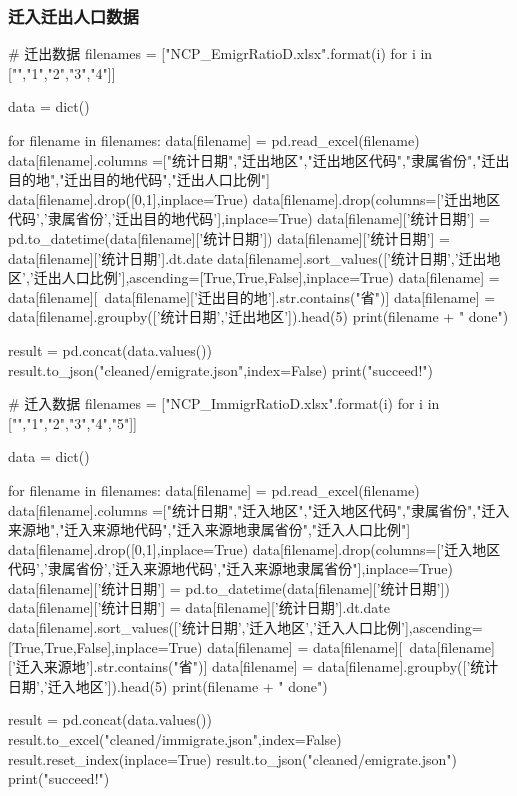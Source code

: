 \documentclass{ctexart}
\begin{document}
\subsubsection{迁入迁出人口数据}
\begin{python}
# 迁出数据
filenames = ["NCP_EmigrRatioD{}.xlsx".format(i) for i in ["","1","2","3","4"]]

data = dict()

for filename in filenames:
    data[filename] = pd.read_excel(filename)
    data[filename].columns =["统计日期","迁出地区","迁出地区代码","隶属省份","迁出目的地","迁出目的地代码","迁出人口比例"]
    data[filename].drop([0,1],inplace=True)
    data[filename].drop(columns=['迁出地区代码','隶属省份','迁出目的地代码'],inplace=True)
    data[filename]['统计日期'] = pd.to_datetime(data[filename]['统计日期'])
    data[filename]['统计日期'] = data[filename]['统计日期'].dt.date
    data[filename].sort_values(['统计日期','迁出地区','迁出人口比例'],ascending=[True,True,False],inplace=True)
    data[filename] = data[filename][~data[filename]['迁出目的地'].str.contains("省")]
    data[filename] = data[filename].groupby(['统计日期','迁出地区']).head(5)
    print(filename + " done")

result = pd.concat(data.values())
result.to_json("cleaned/emigrate.json",index=False)
print("succeed!")


# 迁入数据
filenames = ["NCP_ImmigrRatioD{}.xlsx".format(i) for i in ["","1","2","3","4","5"]]

data = dict()

for filename in filenames:
    data[filename] = pd.read_excel(filename)
    data[filename].columns =["统计日期","迁入地区","迁入地区代码","隶属省份","迁入来源地","迁入来源地代码","迁入来源地隶属省份","迁入人口比例"]
    data[filename].drop([0,1],inplace=True)
    data[filename].drop(columns=['迁入地区代码','隶属省份','迁入来源地代码',"迁入来源地隶属省份"],inplace=True)
    data[filename]['统计日期'] = pd.to_datetime(data[filename]['统计日期'])
    data[filename]['统计日期'] = data[filename]['统计日期'].dt.date
    data[filename].sort_values(['统计日期','迁入地区','迁入人口比例'],ascending=[True,True,False],inplace=True)
    data[filename] = data[filename][~data[filename]['迁入来源地'].str.contains("省")]
    data[filename] = data[filename].groupby(['统计日期','迁入地区']).head(5)
    print(filename + " done")

result = pd.concat(data.values())
result.to_excel("cleaned/immigrate.json",index=False)
result.reset_index(inplace=True)
result.to_json("cleaned/emigrate.json")
print("succeed!")
\end{python}
\end{document}
